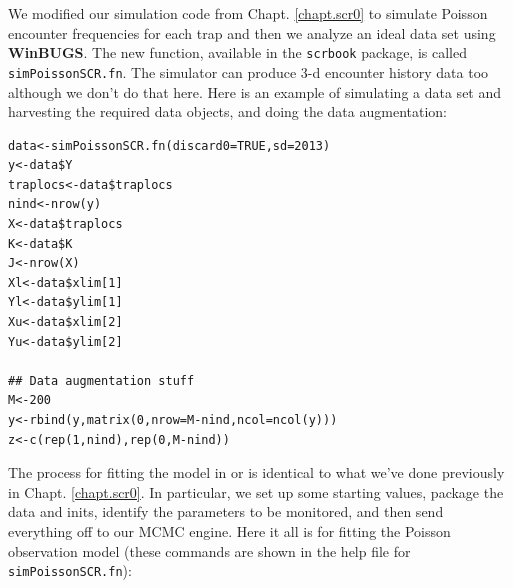 We modified our simulation code from Chapt. \ref{chapt.scr0} 
to simulate Poisson
encounter frequencies for each trap and then we analyze an ideal data
set using {\bf WinBUGS}. The new function, available in the \mbox{\tt scrbook}
package, is called
{\tt simPoissonSCR.fn}. 
The simulator can produce 3-d encounter history data too although we
don't do that here. 
Here is an example of simulating a data set and harvesting the
required data objects, and doing the data augmentation:

{\small
\begin{verbatim}
data<-simPoissonSCR.fn(discard0=TRUE,sd=2013)
y<-data$Y
traplocs<-data$traplocs
nind<-nrow(y)
X<-data$traplocs
K<-data$K
J<-nrow(X)
Xl<-data$xlim[1]
Yl<-data$ylim[1]
Xu<-data$xlim[2]
Yu<-data$ylim[2]

## Data augmentation stuff
M<-200
y<-rbind(y,matrix(0,nrow=M-nind,ncol=ncol(y)))
z<-c(rep(1,nind),rep(0,M-nind))
\end{verbatim}
}


The process for fitting 
the model in \winbugs or \jags is identical to what we've done 
previously in Chapt. \ref{chapt.scr0}. In particular, we set up some
starting values, package the data and inits, identify the parameters
to be monitored, and then send everything off to our MCMC engine. Here
it all is for fitting the Poisson observation model (these commands
are shown in the help file for \mbox{\tt simPoissonSCR.fn}):

